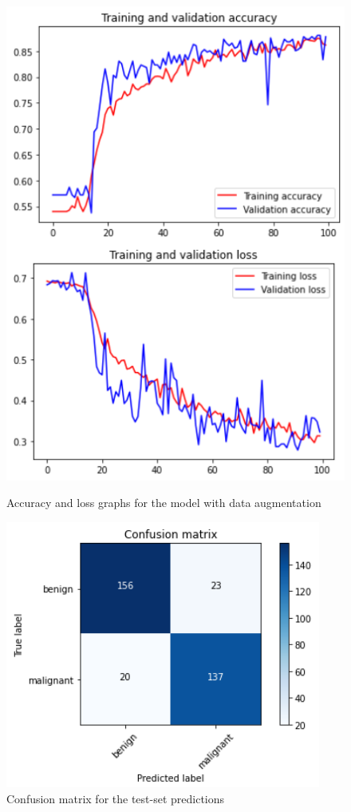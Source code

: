 \documentclass[11pt,a4paper,oneside]{article}
\begin{document}
\begin{figure}[ht]
\centering
	\begin{minipage}[c]{.4\textwidth}
		\centering\setlength{\captionmargin}{0pt}%
		\includegraphics[width=.9\textwidth]{images/2.1-da/da_accuracy}
		\caption{Accuracy and loss graphs for the model with data augmentation}
		\label{fig:scratch_accuracy_da}
	\end{minipage}
	\hspace{5mm}%
	\begin{minipage}[c]{.4\textwidth}
		\centering\setlength{\captionmargin}{0pt}%
		\includegraphics[width=.9\textwidth]{images/2.1-da/da_matrix}
		\caption{Confusion matrix for the test-set predictions}
		\label{fig:scratch_matrix_da}
	\end{minipage}%
\end{figure}
\end{document}
